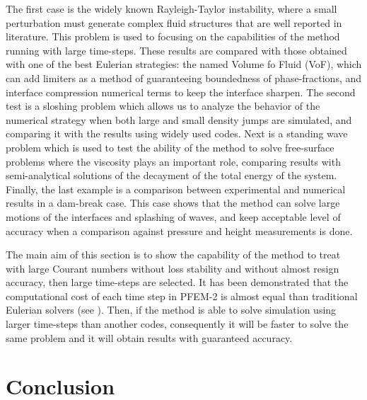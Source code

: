 \documentclass[review]{elsarticle}
\begin{document}
The first case is the widely known Rayleigh-Taylor instability, where a small perturbation must generate complex fluid structures that are well reported in literature.
This problem is used to focusing on the capabilities of the method running with large time-steps. These results are compared with those obtained with one of the best Eulerian strategies: the named Volume fo Fluid (VoF), which can add limiters as a method of guaranteeing boundedness of phase-fractions, and interface compression numerical terms to keep the interface sharpen.
The second test is a sloshing problem which allows us to analyze the behavior of the numerical strategy when both large and small density jumps are simulated, and comparing it with the results using widely used codes. Next is a standing wave problem which is used to test the ability of the method to solve free-surface problems where the viscosity plays an important role, comparing results with semi-analytical solutions of the decayment of the total energy of the system.
Finally, the last example is a comparison between experimental and numerical results in a dam-break case.
This case shows that the method can solve large motions of the interfaces and splashing of waves, and keep acceptable level of accuracy when a comparison against pressure and height measurements is done.

The main aim of this section is to show the capability of the method to treat with large Courant numbers without loss stability and without almost resign accuracy, then large time-steps are selected. It has been demonstrated that the computational cost of each time step in PFEM-2 is almost equal than traditional Eulerian solvers (see \cite{Idelsohn12b}). Then, if the method is able to solve simulation using larger time-steps than another codes, consequently it will be faster to solve the same problem and it will obtain results with guaranteed accuracy.





% 


\section{Conclusion}
\end{document}
